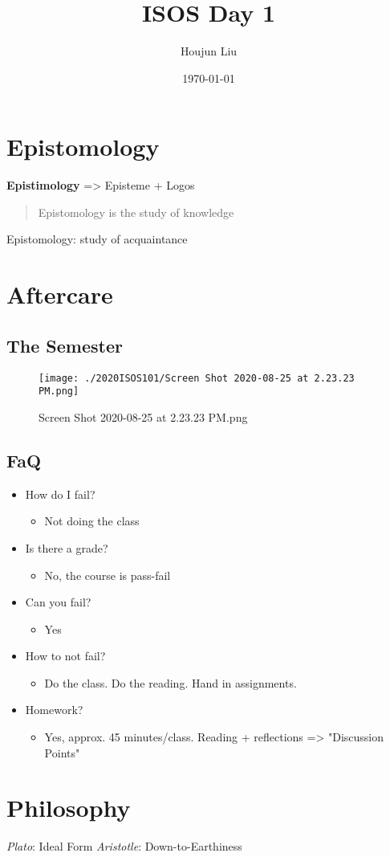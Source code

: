 \documentclass[letterpaper]{article}
\author{Houjun Liu}
\date{\today}
\title{ISOS Day 1}
\renewcommand{\tableofcontents}{}
\begin{document}
\tableofcontents



\section{Epistomology}
\label{sec:org81f4810}
\textbf{Epistimology} => Episteme + Logos

\begin{quote}
Epistomology is the study of knowledge
\end{quote}

Epistomology: study of acquaintance

\section{Aftercare}
\label{sec:orgee6f056}
\subsection{The Semester}
\label{sec:orge44a0c5}
\begin{figure}[htbp]
\centering
\texttt{[image: ./2020ISOS101/Screen Shot 2020-08-25 at 2.23.23 PM.png]}
\caption{Screen Shot 2020-08-25 at 2.23.23 PM.png}
\end{figure}

\subsection{FaQ}
\label{sec:orgf395490}
\begin{itemize}
\item How do I fail?

\begin{itemize}
\item Not doing the class
\end{itemize}

\item Is there a grade?

\begin{itemize}
\item No, the course is pass-fail
\end{itemize}

\item Can you fail?

\begin{itemize}
\item Yes
\end{itemize}

\item How to not fail?

\begin{itemize}
\item Do the class. Do the reading. Hand in assignments.
\end{itemize}

\item Homework?

\begin{itemize}
\item Yes, approx. 45 minutes/class. Reading + reflections => "Discussion
Points"
\end{itemize}
\end{itemize}

\section{Philosophy}
\label{sec:org0f8170c}
\emph{Plato}: Ideal Form \emph{Aristotle}: Down-to-Earthiness
\end{document}
